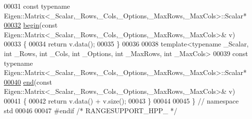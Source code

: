 \begin{DoxyCode}
00031 \textcolor{keyword}{const} \textcolor{keyword}{typename} Eigen::Matrix<\_Scalar,\_Rows,\_Cols,\_Options,\_MaxRows,\_MaxCols>::Scalar*
\hypertarget{RangeSupport_8hpp_source.tex_l00032}{}\hyperlink{namespacestd_a5dbbf4f3aa392edddc233eaba37e4b73}{00032} \hyperlink{namespacestd_acec9a198880c12f51f02be95a298a48b}{begin}(\textcolor{keyword}{const} Eigen::Matrix<\_Scalar,\_Rows,\_Cols,\_Options,\_MaxRows,\_MaxCols>& v)
00033 \{
00034   \textcolor{keywordflow}{return} v.data();
00035 \}
00036 
00038 \textcolor{keyword}{template}<\textcolor{keyword}{typename} \_Scalar, \textcolor{keywordtype}{int} \_Rows, \textcolor{keywordtype}{int} \_Cols, \textcolor{keywordtype}{int} \_Options, \textcolor{keywordtype}{int} \_MaxRows, \textcolor{keywordtype}{int} \_MaxCols>
00039 \textcolor{keyword}{const} \textcolor{keyword}{typename} Eigen::Matrix<\_Scalar,\_Rows,\_Cols,\_Options,\_MaxRows,\_MaxCols>::Scalar*
\hypertarget{RangeSupport_8hpp_source.tex_l00040}{}\hyperlink{namespacestd_a8d57b4b14e873f55a011ed85a84cdb1e}{00040} \hyperlink{namespacestd_aeb4b319cf9afda99ba1f47d32df15bc9}{end}(\textcolor{keyword}{const} Eigen::Matrix<\_Scalar,\_Rows,\_Cols,\_Options,\_MaxRows,\_MaxCols>& v)
00041 \{
00042   \textcolor{keywordflow}{return} v.data() + v.size();
00043 \}
00044 
00045 \} \textcolor{comment}{// namespace std}
00046 
00047 \textcolor{preprocessor}{#endif }\textcolor{comment}{/* RANGESUPPORT\_HPP\_ */}\textcolor{preprocessor}{}
\end{DoxyCode}
